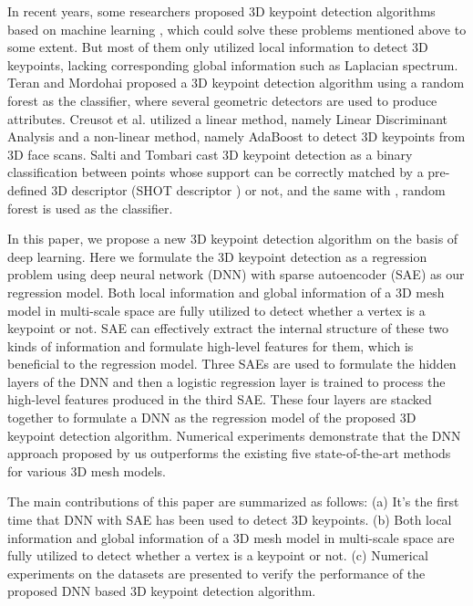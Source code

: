 \documentclass[runningheads]{article}
\begin{document}
In recent years, some researchers proposed 3D keypoint detection algorithms based on machine learning \cite{randomforest20143d,machine3dkeypoint2013machine,salti2015learning}, which could solve these problems mentioned above to some extent. But most of them only utilized local information to detect 3D keypoints, lacking corresponding global information such as Laplacian spectrum. Teran and Mordohai \cite{randomforest20143d} proposed a 3D keypoint detection algorithm using a random forest \cite{ran2001random} as the classifier, where several geometric detectors are used to produce attributes. Creusot et al. \cite{machine3dkeypoint2013machine} utilized a linear method, namely Linear Discriminant Analysis and a non-linear method, namely AdaBoost \cite{adaboost1997decision} to detect 3D keypoints from 3D face scans. Salti and Tombari \cite{salti2015learning} cast 3D keypoint detection as a binary  classification between points whose support can be correctly matched by a pre-defined 3D descriptor (SHOT descriptor \cite{shot2010unique}) or not, and the same with \cite{randomforest20143d}, random forest \cite{ran2001random} is used as the classifier.

In this paper, we propose a new 3D keypoint detection algorithm on the basis of deep learning. Here we formulate the 3D keypoint detection as a regression problem using deep neural network (DNN) with sparse autoencoder (SAE) \cite{sae2011sparse} as our regression model. Both local information and global information of a 3D mesh model in multi-scale space are fully utilized to detect whether a vertex is a keypoint or not. SAE can effectively extract the internal structure of these two kinds of information and formulate high-level features for them, which is beneficial to the regression model. Three SAEs are used to formulate the hidden layers of the DNN and then a logistic regression \cite{logistic1958regression} layer is trained to process the high-level features produced in the third SAE. These four layers are stacked together to formulate a DNN as the regression model of the proposed 3D keypoint detection algorithm. Numerical experiments demonstrate that the DNN approach proposed by us outperforms the existing five state-of-the-art methods for various 3D mesh models.

The main contributions of this paper are summarized as follows: (a) It's the first time that DNN with SAE has been used to detect 3D keypoints. (b) Both local information and global information of a 3D mesh model in multi-scale space are fully utilized to detect whether a vertex is a keypoint or not. (c) Numerical experiments on the datasets \cite{dutagaci2012evaluation} are presented to verify the performance of the proposed DNN based 3D keypoint detection algorithm.
\end{document}
